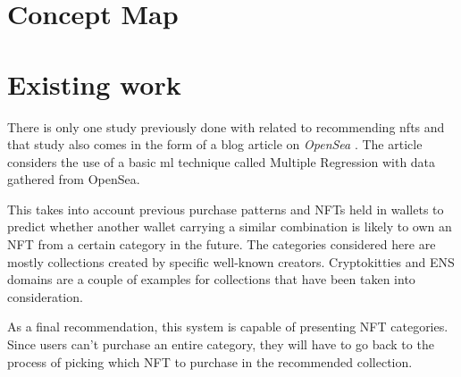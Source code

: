 










\section{Concept Map}

\section{Existing work}

There is only one study previously done with related to recommending \gls{nft}s and that study also comes in the form of a blog article on \emph{OpenSea} \autocite{noauthor_what_2020}. The article considers the use of a basic \gls{ml} technique called Multiple Regression with data gathered from OpenSea.


This takes into account previous purchase patterns and NFTs held in wallets to predict whether another wallet carrying a similar combination is likely to own an NFT from a certain category in the future. The categories considered here are mostly collections created by specific well-known creators. Cryptokitties and ENS domains are a couple of examples for collections that have been taken into consideration.

As a final recommendation, this system is capable of presenting NFT categories. Since users can't purchase an entire category, they will have to go back to the process of picking which NFT to purchase in the recommended collection.

